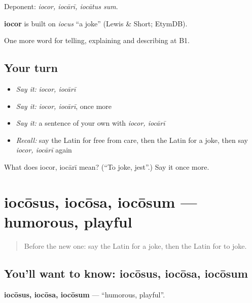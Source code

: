 Deponent: \emph{iocor, iocārī, iocātus sum}.

\begin{cousinweb}
\textbf{iocor} is built on \emph{iocus} \textquotedblleft{}a joke\textquotedblright{} (Lewis \& Short; EtymDB).
\end{cousinweb}

\begin{grammarlens}[title={What you've built}]
One more word for telling, explaining and describing at B1.
\end{grammarlens}

\subsection*{Your turn}
\begin{itemize}
\raggedright
  \item \emph{Say it:} \emph{iocor, iocārī}
  \item \emph{Say it:} \emph{iocor, iocārī}, once more
  \item \emph{Say it:} a sentence of your own with \emph{iocor, iocārī}
  \item \emph{Recall:} say the Latin for free from care, then the Latin for a joke, then say \emph{iocor, iocārī} again
\end{itemize}

\begin{tcolorbox}[breakable,colback=teal!4,colframe=teal!35!black,title={Before you move on}]
What does iocor, iocārī mean? (\textquotedblleft{}To joke, jest\textquotedblright{}.) Say it once more.
\end{tcolorbox}
\section[iocōsus, iocōsa, iocōsum]{iocōsus, iocōsa, iocōsum — humorous, playful}

\label{lesson:LA-C502-iocosus}



\begin{quote}
Before the new one: say the Latin for a joke, then the Latin for to joke.
\end{quote}

\subsection*{You'll want to know: iocōsus, iocōsa, iocōsum}
\textbf{iocōsus, iocōsa, iocōsum} — \textquotedblleft{}humorous, playful\textquotedblright{}.


